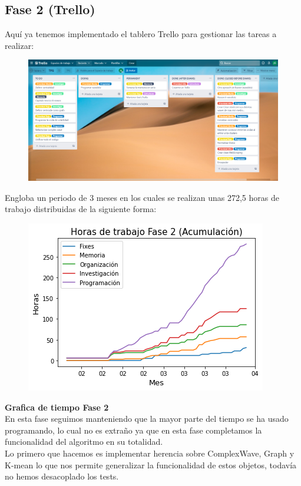 \documentclass[12pt,a4paper]{article}
\begin{document}
	\subsection{Fase 2 (Trello)}
		Aquí ya tenemos implementado el tablero Trello para gestionar las tareas a realizar:\\
\begin{figure}[H]
\centering
  \centering
  \includegraphics[width=1\linewidth]{Tablero Trello Creado}
\label{fig:subrgrafo}
\end{figure}
	Engloba un periodo de 3 meses en los cuales se realizan unas 272,5 horas de trabajo distribuidas de la siguiente forma:\\
\begin{figure}[H]
\centering
  \centering
  \includegraphics[width=0.5\linewidth]{tiempo fase 2}
\label{fig:subrgrafo}
\end{figure}
	\textbf{Grafica de tiempo Fase 2}\\
	En esta fase seguimos manteniendo que la mayor parte del tiempo se ha usado programando, lo cual no es extraño ya que en esta fase completamos la funcionalidad del algoritmo en su totalidad.\\
	Lo primero que hacemos es implementar herencia sobre ComplexWave, Graph y K-mean lo que nos permite generalizar la funcionalidad de estos objetos, todavía no hemos desacoplado los tests.\\
\end{document}

